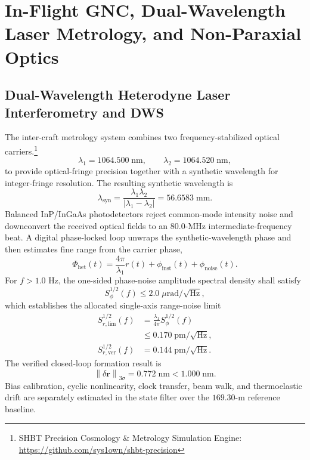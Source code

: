 \documentclass[10pt,twocolumn]{IEEEtran}
\begin{document}
\section{In-Flight GNC, Dual-Wavelength Laser Metrology, and Non-Paraxial Optics}
\label{sec:flight_metrology}

\subsection{Dual-Wavelength Heterodyne Laser Interferometry and DWS}
\label{sec:heterodyne_dws}

The inter-craft metrology system combines two frequency-stabilized optical carriers.\footnote{SHBT Precision Cosmology \& Metrology Simulation Engine: \url{https://github.com/sys1own/shbt-precision}}
\begin{equation}
\lambda_1=1064.500\;\mathrm{nm},\qquad
\lambda_2=1064.520\;\mathrm{nm},
\label{eq:metrology_wavelengths}
\end{equation}
to provide optical-fringe precision together with a synthetic wavelength for integer-fringe resolution.  The resulting synthetic wavelength is
\begin{equation}
\lambda_{\mathrm{syn}}
=\frac{\lambda_1\lambda_2}{|\lambda_1-\lambda_2|}
=56.6583\;\mathrm{mm}.
\label{eq:synthetic_wavelength}
\end{equation}
Balanced InP/InGaAs photodetectors reject common-mode intensity noise and downconvert the received optical fields to an $80.0$-MHz intermediate-frequency beat.  A digital phase-locked loop unwraps the synthetic-wavelength phase and then estimates fine range from the carrier phase,
\begin{equation}
\Phi_{\mathrm{het}}(t)
=\frac{4\pi}{\lambda_1}r(t)
+\phi_{\mathrm{inst}}(t)+\phi_{\mathrm{noise}}(t).
\label{eq:heterodyne_phase}
\end{equation}
For $f>1.0$ Hz, the one-sided phase-noise amplitude spectral density shall satisfy
\begin{equation}
S_{\phi}^{1/2}(f)\leq2.0\;\mu\mathrm{rad}/\sqrt{\mathrm{Hz}},
\label{eq:phase_noise_asd}
\end{equation}
which establishes the allocated single-axis range-noise limit
\begin{equation}
\begin{aligned}
S_{r,\mathrm{lim}}^{1/2}(f)
&=\frac{\lambda_1}{4\pi}S_\phi^{1/2}(f) \\
&\leq0.170\;\mathrm{pm}/\sqrt{\mathrm{Hz}}, \\
S_{r,\mathrm{ver}}^{1/2}(f)
&=0.144\;\mathrm{pm}/\sqrt{\mathrm{Hz}}.
\end{aligned}
\label{eq:range_noise_asd}
\end{equation}
The verified closed-loop formation result is
\begin{equation}
\left\|\delta\bm r\right\|_{3\sigma}
=0.772\;\mathrm{nm}<1.000\;\mathrm{nm}.
\label{eq:verified_formation_tracking}
\end{equation}
Bias calibration, cyclic nonlinearity, clock transfer, beam walk, and thermoelastic drift are separately estimated in the state filter over the $169.30$-m reference baseline.
\end{document}
